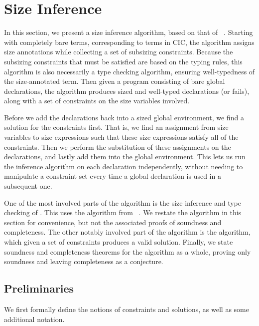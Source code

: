 \section{Size Inference}\label{sec:algorithm}

In this section, we present a size inference algorithm, based on that of \CIChat~\citep{cic-hat}.
Starting with completely bare terms, corresponding to terms in CIC,
the algorithm assigns size annotations while collecting a set of subsizing constraints.
Because the subsizing constraints that must be satisfied are based on the typing rules,
this algorithm is also necessarily a type checking algorithm,
ensuring well-typedness of the size-annotated term.
Then given a program consisting of bare global declarations,
the algorithm produces sized and well-typed declarations (or fails),
along with a set of constraints on the size variables involved.

Before we add the declarations back into a sized global environment,
we find a solution for the constraints first.
That is, we find an assignment from size variables to size expressions
such that these size expressions satisfy all of the constraints.
Then we perform the substitution of these assignments on the declarations,
and lastly add them into the global environment.
This lets us run the inference algorithm on each declaration independently,
without needing to manipulate a constraint set every time a global declaration is used in a subsequent one.

One of the most involved parts of the algorithm is the size inference and type checking of \cofixpoints.
This uses the \RecCheck algorithm from \Fhat~\citep{f-hat}.
We restate the algorithm in this section for convenience, but not the associated proofs of soundness and completeness.
The other notably involved part of the algorithm is the \solve algorithm,
which given a set of constraints produces a valid solution.
Finally, we state soundness and completeness theorems for the algorithm as a whole,
proving only soundness and leaving completeness as a conjecture.

\subsection{Preliminaries}

We first formally define the notions of constraints and solutions,
as well as some additional notation.

